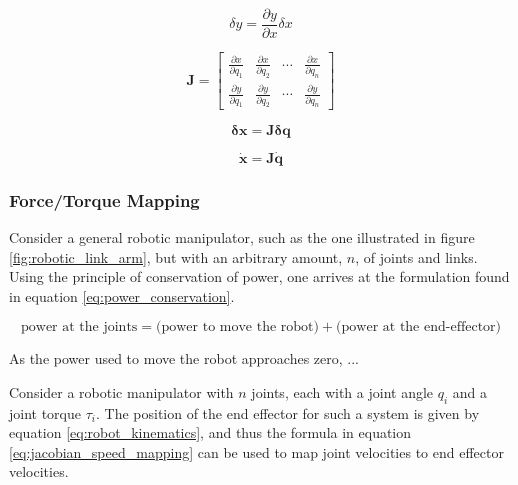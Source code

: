 \begin{equation}
    \label{eq:infinitesimal_change}
    \delta  y = \frac{\partial y}{\partial x} \delta x
\end{equation}

\begin{equation}
    \label{eq:jacobian}
    \mathbf{J} = \begin{bmatrix}
        \frac{\partial x}{\partial q_1} & \frac{\partial x}{\partial q_2} & \cdots & \frac{\partial x}{\partial q_n} \\
        \frac{\partial y}{\partial q_1} & \frac{\partial y}{\partial q_2} & \cdots & \frac{\partial y}{\partial q_n}
    \end{bmatrix}
\end{equation}

\begin{equation}
    \label{eq:jacobian_pos_mapping}
    \mathbf{\delta x} = \mathbf{J}\mathbf{\delta q}
\end{equation}

\begin{equation}
    \label{eq:jacobian_speed_mapping}
    \mathbf{\dot x} = \mathbf{J}\mathbf{\dot q}
\end{equation}

    \subsubsection{Force/Torque Mapping}
    \label{sec:force_torque_mapping}

    Consider a general robotic manipulator, such as the one illustrated in figure \ref{fig:robotic_link_arm}, but with an arbitrary amount, $n$, of joints and links. Using the principle of conservation of power, one arrives at the formulation found in equation \ref{eq:power_conservation}.

    \begin{equation}
        \text{power at the joints} = \text{(power to move the robot)} + \text{(power at the end-effector)}
        \label{eq:power_conservation}
    \end{equation}
    
    As the power used to move the robot approaches zero, ...

    Consider a robotic manipulator with $n$ joints, each with a joint angle $q_i$ and a joint torque $\tau_i$. The position of the end effector for such a system is given by equation \ref{eq:robot_kinematics}, and thus the formula in equation \ref{eq:jacobian_speed_mapping} can be used to map joint velocities to end effector velocities. 

